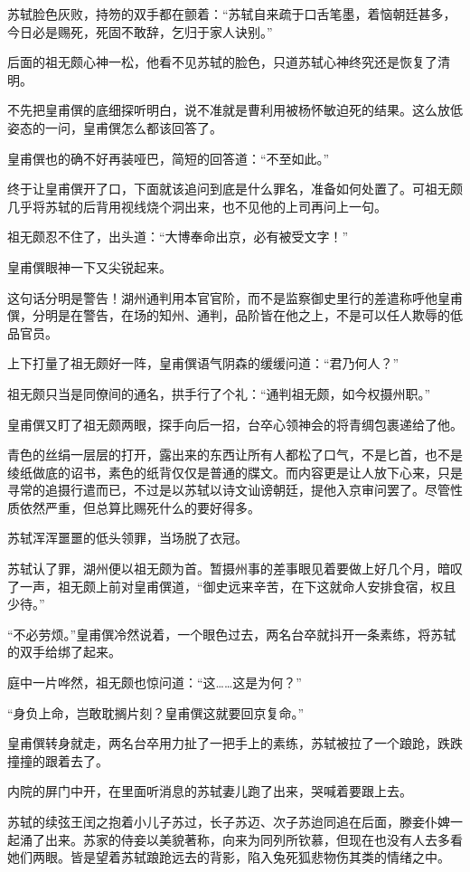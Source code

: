 苏轼脸色灰败，持笏的双手都在颤着：“苏轼自来疏于口舌笔墨，着恼朝廷甚多，今日必是赐死，死固不敢辞，乞归于家人诀别。”

后面的祖无颇心神一松，他看不见苏轼的脸色，只道苏轼心神终究还是恢复了清明。

不先把皇甫僎的底细探听明白，说不准就是曹利用被杨怀敏迫死的结果。这么放低姿态的一问，皇甫僎怎么都该回答了。

皇甫僎也的确不好再装哑巴，简短的回答道：“不至如此。”

终于让皇甫僎开了口，下面就该追问到底是什么罪名，准备如何处置了。可祖无颇几乎将苏轼的后背用视线烧个洞出来，也不见他的上司再问上一句。

祖无颇忍不住了，出头道：“大博奉命出京，必有被受文字！”

皇甫僎眼神一下又尖锐起来。

这句话分明是警告！湖州通判用本官官阶，而不是监察御史里行的差遣称呼他皇甫僎，分明是在警告，在场的知州、通判，品阶皆在他之上，不是可以任人欺辱的低品官员。

上下打量了祖无颇好一阵，皇甫僎语气阴森的缓缓问道：“君乃何人？”

祖无颇只当是同僚间的通名，拱手行了个礼：“通判祖无颇，如今权摄州职。”

皇甫僎又盯了祖无颇两眼，探手向后一招，台卒心领神会的将青绸包裹递给了他。

青色的丝绢一层层的打开，露出来的东西让所有人都松了口气，不是匕首，也不是绫纸做底的诏书，素色的纸背仅仅是普通的牒文。而内容更是让人放下心来，只是寻常的追摄行遣而已，不过是以苏轼以诗文讪谤朝廷，提他入京审问罢了。尽管性质依然严重，但总算比赐死什么的要好得多。

苏轼浑浑噩噩的低头领罪，当场脱了衣冠。

苏轼认了罪，湖州便以祖无颇为首。暂摄州事的差事眼见着要做上好几个月，暗叹了一声，祖无颇上前对皇甫僎道，“御史远来辛苦，在下这就命人安排食宿，权且少待。”

“不必劳烦。”皇甫僎冷然说着，一个眼色过去，两名台卒就抖开一条素练，将苏轼的双手给绑了起来。

庭中一片哗然，祖无颇也惊问道：“这……这是为何？”

“身负上命，岂敢耽搁片刻？皇甫僎这就要回京复命。”

皇甫僎转身就走，两名台卒用力扯了一把手上的素练，苏轼被拉了一个踉跄，跌跌撞撞的跟着去了。

内院的屏门中开，在里面听消息的苏轼妻儿跑了出来，哭喊着要跟上去。

苏轼的续弦王闰之抱着小儿子苏过，长子苏迈、次子苏迨同追在后面，滕妾仆婢一起涌了出来。苏家的侍妾以美貌著称，向来为同列所钦慕，但现在也没有人去多看她们两眼。皆是望着苏轼踉跄远去的背影，陷入兔死狐悲物伤其类的情绪之中。

